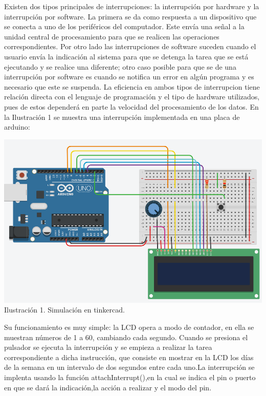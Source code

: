 \documentclass{article}
\begin{document}
\vspace{10pt}
Existen dos tipos principales de interrupciones: la interrupción por hardware y la interrupción por software. La primera se da como respuesta a un dispositivo que se conecta a uno de los periféricos del computador. Este envía una señal a la unidad central de procesamiento para que se realicen las operaciones correspondientes. Por otro lado las interrupciones de software suceden cuando el usuario envía la indicación al sistema para que se detenga la tarea que se está ejecutando y se realice una diferente; otro caso posible para que se de una interrupción por software es cuando se notifica un error en algún programa y es necesario que este se suspenda. La eficiencia en ambos tipos de interrupcion tiene relación directa con el lenguaje de programación y el tipo de hardware utilizados, pues de estos dependerá en parte la velocidad del procesamiento de los datos.
\newpage
En la Ilustración 1 se muestra una interrupción implementada en una placa de arduino: 
\vspace{10pt}
\begin{center}
\includegraphics[scale=0.6]{arduino.png}
\normalsize
Ilustración 1. Simulación en tinkercad.
\end{center}
\vspace{20pt}
\large
Su funcionamiento es muy simple: la LCD opera a modo de contador, en ella se muestran números de 1 a 60, cambiando cada segundo. Cuando se presiona el pulsador se ejecuta la interrupción y se empieza a realizar la tarea correspondiente a dicha instrucción, que consiste en mostrar en la LCD los días de la semana en un intervalo de dos segundos entre cada uno.La interrupción se implenta usando la función attachInterrupt(),en la cual se indica el pin o puerto en que se dará la indicación,la acción a realizar y el modo del pin.
\vspace{10pt}
\end{document}
